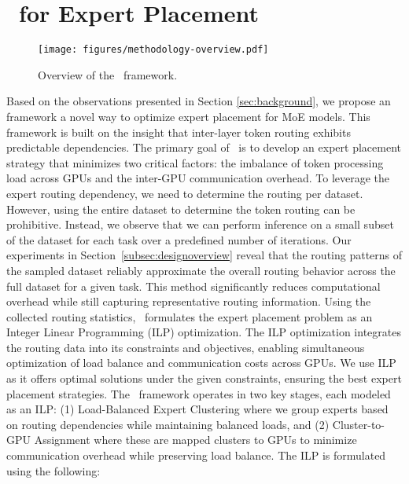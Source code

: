 \section{\expertune~for Expert Placement}

\begin{figure*}
    \centering
    \texttt{[image: figures/methodology-overview.pdf]}
    \caption{Overview of the \expertune~framework.}
    \label{fig:methodology-overview}
    \vspace{-3ex}
\end{figure*}


Based on the observations presented in Section \ref{sec:background}, we propose an \expertune~ framework a novel way to optimize expert placement for MoE models. This framework is built on the insight that inter-layer token routing exhibits predictable dependencies.
% 
The primary goal of \expertune~is to develop an expert placement strategy that minimizes two critical factors: the imbalance of token processing load across GPUs and the inter-GPU communication overhead.
%
To leverage the expert routing dependency, we need to determine the routing per dataset.
%
However, using the entire dataset to determine the token routing can be prohibitive. 
%
Instead, we observe that we can perform inference on a small subset of the dataset for each task over a predefined number of iterations.
% 
Our experiments in Section~\ref{subsec:designoverview} reveal that the routing patterns of the sampled dataset reliably approximate the overall routing behavior across the full dataset for a given task.
% 
This method significantly reduces computational overhead while still capturing representative routing information.
%
Using the collected routing statistics, \expertune~formulates the expert placement problem as an Integer Linear Programming (ILP) optimization. The ILP optimization integrates the routing data into its constraints and objectives, enabling simultaneous optimization of load balance and communication costs across GPUs.
% 
We use ILP as it offers optimal solutions under the given constraints, ensuring the best expert placement strategies. 
%
The \expertune~framework operates in two key stages, each modeled as an ILP: (1) Load-Balanced Expert Clustering where we group experts based on routing dependencies while maintaining balanced loads, and (2) Cluster-to-GPU Assignment where these are mapped clusters to GPUs to minimize communication overhead while preserving load balance.
%
The ILP is formulated using the following:

